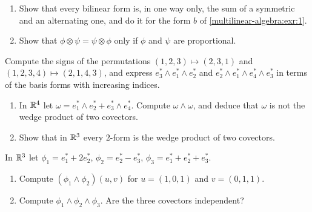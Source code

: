\begin{notechapter}
\begin{exercise}\label{multilinear-algebra:exr:2}
\begin{enumerate}[nosep]
  \item Show that every bilinear form is, in one way only, the sum of a
        symmetric and an alternating one, and do it for the form $b$ of
        \cref{multilinear-algebra:exr:1}.
  \item Show that $\phi\otimes\psi = \psi\otimes\phi$ only if $\phi$ and
        $\psi$ are proportional.
\end{enumerate}
\end{exercise}

\begin{exercise}\label{multilinear-algebra:exr:3}
Compute the signs of the permutations $(1, 2, 3)\mapsto(2, 3, 1)$ and
$(1, 2, 3, 4)\mapsto(2, 1, 4, 3)$, and express
$e_3^*\wedge e_1^*\wedge e_2^*$ and
$e_2^*\wedge e_1^*\wedge e_4^*\wedge e_3^*$ in terms of the basis forms
with increasing indices.
\end{exercise}

\begin{exercise}\label{multilinear-algebra:exr:4}
\begin{enumerate}[nosep]
  \item In $\mathbb{R}^4$ let $\omega = e_1^*\wedge e_2^* + e_3^*\wedge e_4^*$.
        Compute $\omega\wedge\omega$, and deduce that $\omega$ is not
        the wedge product of two covectors.
  \item Show that in $\mathbb{R}^3$ every $2$-form is the wedge product of two
        covectors.
\end{enumerate}
\end{exercise}

\begin{exercise}\label{multilinear-algebra:exr:5}
In $\mathbb{R}^3$ let $\phi_1 = e_1^* + 2e_2^*$, $\phi_2 = e_2^* - e_3^*$,
$\phi_3 = e_1^* + e_2^* + e_3^*$.
\begin{enumerate}[nosep]
  \item Compute $(\phi_1\wedge\phi_2)(u, v)$ for $u = (1, 0, 1)$ and
        $v = (0, 1, 1)$.
  \item Compute $\phi_1\wedge\phi_2\wedge\phi_3$. Are the three
        covectors independent?
\end{enumerate}
\end{exercise}


\end{notechapter}
